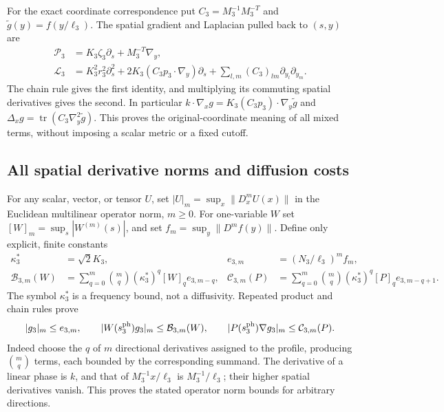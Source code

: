 For the exact coordinate correspondence put
$C_3=M_3^{-1}M_3^{-T}$ and $\widetilde g(y)=f(y/\ell_3)$.
The spatial gradient and Laplacian pulled back to $(s,y)$ are
\begin{equation}\label{tgs:metric}
 \begin{split}
 \mathcal P_3&=K_3\zeta_3\partial_s+M_3^{-T}\nabla_y,\\
 \mathcal L_3&=K_3^2r_3^2\partial_s^2
       +2K_3(C_3p_3\cdot\nabla_y)\partial_s
       +\sum_{l,m}(C_3)_{lm}\partial_{y_l}\partial_{y_m}.
 \end{split}
\end{equation}
The chain rule gives the first identity, and multiplying its
commuting spatial derivatives gives the second. In particular
$k\cdot\nabla_xg=K_3(C_3p_3)\cdot\nabla_y\widetilde g$ and
$\Delta_xg=\operatorname{tr}(C_3\nabla_y^2\widetilde g)$.
This proves the original-coordinate meaning of all mixed terms,
without imposing a scalar metric or a fixed cutoff.

\subsection{All spatial derivative norms and diffusion costs}

For any scalar, vector, or tensor $U$, set
$|U|_m=\sup_x\|D_x^mU(x)\|$ in the Euclidean multilinear
operator norm, $m\geq0$. For one-variable $W$ set
$[W]_m=\sup_s|W^{(m)}(s)|$, and set
$f_m=\sup_y\|D^mf(y)\|$.
Define only explicit, finite constants
\begin{align}
 \kappa_3^*&=\sqrt2K_3,&
 e_{3,m}&=(N_3/\ell_3)^mf_m,\nonumber\\
 \mathcal B_{3,m}(W)&=\sum_{q=0}^m\binom mq
                (\kappa_3^*)^q[W]_qe_{3,m-q},&
 \mathcal C_{3,m}(P)&=\sum_{q=0}^m\binom mq
                (\kappa_3^*)^q[P]_qe_{3,m-q+1}.
 \label{tgs:normdefinitions}
\end{align}
The symbol $\kappa_3^*$ is a frequency bound, not a diffusivity.
Repeated product and chain rules prove
\[
 |g_3|_m\leq e_{3,m},\qquad
 |W(s_3^{\rm ph})g_3|_m\leq\mathcal B_{3,m}(W),\qquad
 |P(s_3^{\rm ph})\nabla g_3|_m\leq\mathcal C_{3,m}(P).
\]
Indeed choose the $q$ of $m$ directional derivatives assigned to
the profile, producing $\binom mq$ terms, each bounded by the
corresponding summand. The derivative of a linear phase is $k$,
and that of $M_3^{-1}x/\ell_3$ is $M_3^{-1}/\ell_3$;
their higher spatial derivatives vanish. This proves the stated
operator norm bounds for arbitrary directions.

